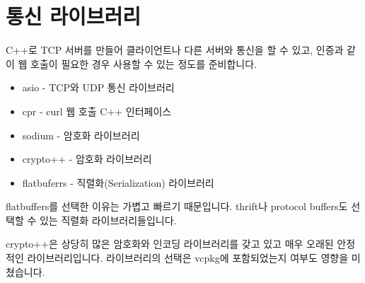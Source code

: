 \chapter{통신 라이브러리}

C++로 TCP 서버를 만들어 클라이언트나 다른 서버와 통신을 할 수 있고, 인증과 같이 
웹 호출이 필요한 경우 사용할 수 있는 정도를 준비합니다. 

\begin{itemize}
    \item asio - TCP와 UDP 통신 라이브러리
    \item cpr  - curl 웹 호출 C++ 인터페이스
    \item sodium  - 암호화 라이브러리
    \item crypto++ - 암호화 라이브러리
    \item flatbuferrs - 직렬화(Serialization) 라이브러리
\end{itemize}

flatbuffers를 선택한 이유는 가볍고 빠르기 때문입니다. thrift나 protocol buffers도 
선택할 수 있는 직렬화 라이브러리들입니다. 

crypto++은 상당히 많은 암호화와 인코딩 라이브러리를 갖고 있고 매우 오래된 안정적인 
라이브러리입니다. 라이브러리의 선택은 vcpkg에 포함되었는지 여부도 영향을 미쳤습니다. 
